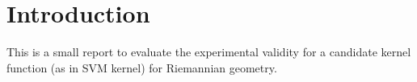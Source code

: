 \section{Introduction}

This is a small report to evaluate the experimental validity for a candidate kernel function (as in SVM kernel) for Riemannian geometry. 
